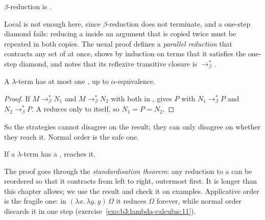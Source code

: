 \begin{theorem}\label{thm:b3:lambda-calculus:church-rosser}
$\beta$-reduction is .
\end{theorem}

\admitted

Local  is not enough here, since $\beta$-reduction does not terminate, and a one-step diamond fails: reducing a  inside an argument that is copied twice must be repeated in both copies. The usual proof defines a \emph{parallel reduction} that contracts any set of  at once, shows by induction on terms that it satisfies the one-step diamond, and notes that its reflexive transitive closure is $\to_\beta^*$.

\begin{corollary}\label{cor:b3:lambda-calculus:unique}
A $\lambda$-term has at most one , up to $\alpha$-equivalence.
\end{corollary}

\begin{proof}
If $M \to_\beta^* N_1$ and $M \to_\beta^* N_2$ with both in ,  gives $P$ with $N_1 \to_\beta^* P$ and $N_2 \to_\beta^* P$. A  reduces only to itself, so $N_1 = P = N_2$.
\end{proof}

So the strategies cannot disagree on the result; they can only disagree on whether they reach it. Normal order is the safe one.

\begin{theorem}\label{thm:b3:lambda-calculus:normal-order}
If a $\lambda$-term has a ,  reaches it.
\end{theorem}

\admitted

The proof goes through the \emph{standardisation theorem}: any reduction to a  can be reordered so that it contracts  from left to right, outermost first. It is longer than this chapter allows; we use the result and check it on examples. Applicative order is the fragile one: in $(\lambda x.\,\lambda y.\,y)\,\Omega$ it reduces $\Omega$ forever, while normal order discards it in one step (exercise~\ref{exo:b3:lambda-calculus:11}).

